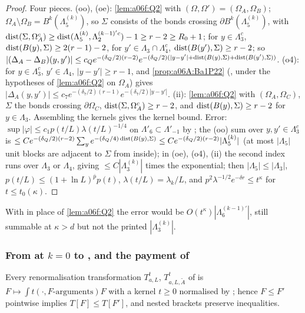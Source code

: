 \begin{proof}
Four pieces. (oo), (oe): \cref{lem:a06f:Q2} with $(\Omega,\Omega')=(\Omega_A,\Omega_B)$; $\Omega_A\setminus\Omega_B=B^k(\Lambda^{(k)}_5)$, so $\Sigma$ consists of the bonds crossing $\partial B^k(\Lambda^{(k)}_5)$, with $\operatorname{dist}(\Sigma,\Omega_A^c)\ge\operatorname{dist}(\Lambda^{(k)}_5,\Lambda^{(k-1)'c}_2)-1\ge r-2\ge R_0+1$; for $y\in\Lambda_3^c$, $\operatorname{dist}(B(y),\Sigma)\ge2(r-1)-2$, for $y'\in\Lambda_3\cap\Lambda_4^c$, $\operatorname{dist}(B(y'),\Sigma)\ge r-2$; so $|(\Delta_A-\Delta_B)(y,y')|\le c_Qe^{-(\delta_Q/2)(r-2)}e^{-(\delta_Q/2)(|y-y'|+\operatorname{dist}(B(y),\Sigma)+\operatorname{dist}(B(y'),\Sigma))}$. (o4): for $y\in\Lambda_3^c$, $y'\in\Lambda_4$, $|y-y'|\ge r-1$, and \cref{prop:a06A:Ba1P22} (\cite[(2.27)]{Ba1}, under the hypotheses of \cref{lem:a06f:Q2} on $\Omega_A$) gives $|\Delta_A(y,y')|\le c_7e^{-(\delta_7/2)(r-1)}e^{-(\delta_7/2)|y-y'|}$. (ii): \cref{lem:a06f:Q2} with $(\Omega_A,\Omega_C)$, $\Sigma$ the bonds crossing $\partial\Omega_C$, $\operatorname{dist}(\Sigma,\Omega_A^c)\ge r-2$, and $\operatorname{dist}(B(y),\Sigma)\ge r-2$ for $y\in\Lambda_3$. Assembling the kernels gives the kernel bound. Error: $\sup|\varphi|\le c_1p(t/L)\lambda(t/L)^{-1/4}$ on $\Lambda'_6\subset\Lambda'_{-1}$ by \cite[(2.55)]{Ba2}; the (oo) sum over $y,y'\in\Lambda_3^c$ is $\le Ce^{-(\delta_Q/2)(r-2)}\sum_ye^{-(\delta_Q/4)\operatorname{dist}(B(y),\Sigma)}\le Ce^{-(\delta_Q/2)(r-2)}|\Lambda^{(k)}_5|$ (at most $|\Lambda_5|$ unit blocks are adjacent to $\Sigma$ from inside); in (oe), (o4), (ii) the second index runs over $\Lambda_3$ or $\Lambda_4$, giving $\le C|\Lambda^{(k)}_3|$ times the exponential; then $|\Lambda_5|\le|\Lambda_3|$, $p(t/L)\le(1+\ln L)^{\bar p}p(t)$, $\lambda(t/L)=\lambda_k/L$, and $p^2\lambda^{-1/2}e^{-\delta r}\le t^\kappa$ for $t\le t_0(\kappa)$.
\end{proof}

With \cite[(2.29)]{Ba1} in place of \cref{lem:a06f:Q2} the error would be $O(t^\kappa)|\Lambda^{(k-1)'}_6|$, still summable at $\kappa>d$ but not the printed $|\Lambda^{(k)}_3|$.

\subsubsection*{From \cite[(3.5)]{Ba2} at $k=0$ to \cite[(3.21)]{Ba2}, and the payment of \cite[Sect.~3C]{Ba2}}

\begin{lemma}\label{lem:a06f:C141}
Every renormalisation transformation $T^t_{a,L}$, $T^t_{a,L,\tilde A}$ of \cite[Sect.~3]{Ba2} is $F\mapsto\int t(\cdot,F\text{-arguments})F$ with a kernel $t\ge0$ normalised by \cite[(3.32)]{Ba2}; hence $F\le F'$ pointwise implies $T[F]\le T[F']$, and nested brackets preserve inequalities.
\end{lemma}

